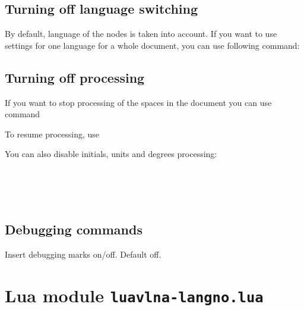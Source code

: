 \documentclass[12pt]{ltxdoc}
\newenvironment{mycode}{
	\medskip%
	\parindent=0pt%
}{\medskip}
\begin{document}
\subsection{Turning off language switching}

By default, language of the nodes is taken into account. If you want to use
settings for one language for a whole document, you can use following command:

\begin{mycode}
\cmd{\preventsinglelang}
\end{mycode}

\subsection{Turning off processing}

If you want to stop processing of the spaces in the document you can use command

\begin{mycode}
\cmd{\preventsingleoff}
\end{mycode}

To resume processing, use

\begin{mycode}
\cmd{\preventsingleon}
\end{mycode}

You can also disable initials, units and degrees processing:

\begin{mycode}
  \cmd{\noinitials}\\
  \cmd{\nounits}\\
  \cmd{\nopredegrees}\\
  \cmd{\nosufdegrees}
\end{mycode}

\subsection{Debugging commands}
\begin{mycode}
\cmd{\preventsingledebugon}\par
\cmd{\preventsingledebugoff}
\end{mycode}

Insert debugging marks on/off. Default off.

\section{Lua module \texttt{luavlna-langno.lua}}
\end{document}
